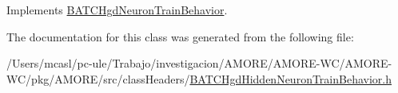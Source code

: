 Implements \hyperlink{class_b_a_t_c_hgd_neuron_train_behavior_a718bebef530c49fd596c9b8fed0add47}{BATCHgdNeuronTrainBehavior}.



The documentation for this class was generated from the following file:\begin{DoxyCompactItemize}
\item 
/Users/mcasl/pc-\/ule/Trabajo/investigacion/AMORE/AMORE-\/WC/AMORE-\/WC/pkg/AMORE/src/classHeaders/\hyperlink{_b_a_t_c_hgd_hidden_neuron_train_behavior_8h}{BATCHgdHiddenNeuronTrainBehavior.h}\end{DoxyCompactItemize}
